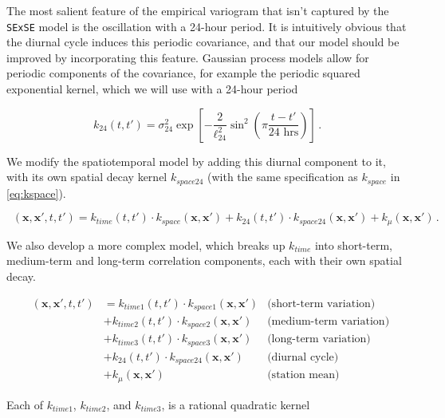 \documentclass[letter]{article}
\newcommand{\genericdel}[3]{%
      \left#1#3\right#2
    }
\newcommand{\del}[1]{\genericdel(){#1}}
\newcommand{\sbr}[1]{\genericdel[]{#1}}
\newcommand{\xvec}{\mathbold{x}}
\DeclareMathOperator{\kdiurn}{k_{\mathtt{SESE_24}}}
\DeclareMathOperator{\ksumprod}{k_{\mathtt{sumprod}}}
\begin{document}
The most salient feature of the empirical variogram that isn't captured by the \texttt{SExSE} model is the oscillation with a 24-hour period. It is intuitively obvious that the diurnal cycle induces this periodic covariance, and that our model should be improved by incorporating this feature. Gaussian process models allow for periodic components of the covariance, for example the periodic squared exponential kernel, which we will use with a 24-hour period

\begin{equation}
    k_{24}(t,t') = \sigma_{24}^2 \exp\sbr{ - \frac{2}{\ell_{24}^2} \sin^2\del{
        \pi \frac{t-t'}{\text{24 hrs}} 
        }}\,.
\end{equation}

We modify the spatiotemporal model by adding this diurnal component to it, with its own spatial decay kernel \(k_{space24}\) (with the same specification as \(k_{space}\) in \eqref{eq:kspace}).

\begin{equation}
    \kdiurn(\xvec,\xvec',t,t') = k_{time}(t,t') \cdot k_{space}(\xvec, \xvec') 
        + k_{24}(t,t') \cdot k_{space24}(\xvec, \xvec')
        + k_\mu(\xvec, \xvec') 
        \,.
\end{equation}
    


        We also develop a more complex model, which breaks up \(k_{time}\) into short-term, medium-term and long-term correlation components, each with their own spatial decay.

\begin{equation}
\begin{aligned}
    \ksumprod(\xvec,\xvec',t,t') &= 
           k_{time1}(t,t') \cdot k_{space1}(\xvec, \xvec')  &\text{(short-term variation)} \\
        &+ k_{time2}(t,t') \cdot k_{space2}(\xvec, \xvec')  &\text{(medium-term variation)} \\
        &+ k_{time3}(t,t') \cdot k_{space3}(\xvec, \xvec')  &\text{(long-term variation)} \\
        &+ k_{24}(t,t') \cdot k_{space24}(\xvec, \xvec') &\text{(diurnal cycle)} \\
        &+ k_\mu(\xvec, \xvec') &\text{(station mean)}
\end{aligned}
\end{equation}

Each of \(k_{time1}\), \(k_{time2}\), and \(k_{time3}\), is a rational quadratic kernel
\end{document}
